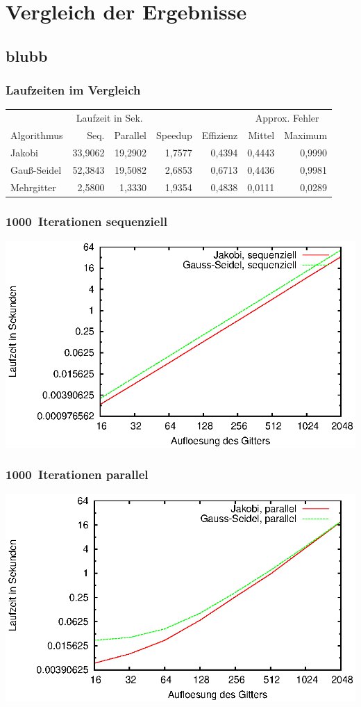 \documentclass{beamer}
\begin{document}
\section{Vergleich der Ergebnisse}
\subsection*{blubb}
\begin{frame}
    \frametitle{Laufzeiten im Vergleich}
    \footnotesize
    \begin{tabular}{|l|r|r|r|r|r|r|} \hline
    & \multicolumn{2}{c|}{Laufzeit in Sek.} & & & \multicolumn{2}{c|}{Approx. Fehler} \\
    Algorithmus & Seq.    & Parallel & Speedup & Effizienz & Mittel   & Maximum \\ \hline \hline
    Jakobi      & 33,9062 & 19,2902  & 1,7577  & 0,4394    & 0,4443   & 0,9990  \\
    Gauß-Seidel & 52,3843 & 19,5082  & 2,6853  & 0,6713    & 0,4436   & 0,9981  \\
    Mehrgitter  & 2,5800  & 1,3330   & 1,9354  & 0,4838    & 0,0111   & 0,0289  \\ \hline
    \end{tabular}
\end{frame}

\begin{frame}
    \frametitle{1000~Iterationen sequenziell}
    \includegraphics[width=\textwidth]{plots/laufzeitensequenziell}
\end{frame}

\begin{frame}
    \frametitle{1000~Iterationen parallel}
    \includegraphics[width=\textwidth]{plots/laufzeitenparallel}
\end{frame}
\end{document}
